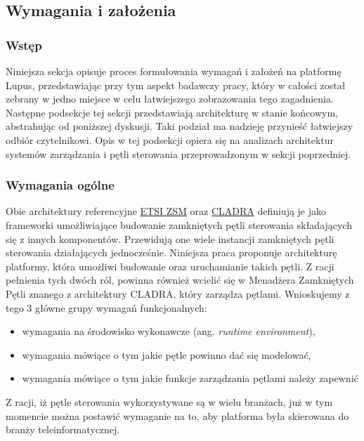 \subsection{Wymagania i założenia}

\subsubsection{Wstęp}

Niniejsza sekcja opisuje proces formułowania wymagań i założeń na platformę Lupus, przedstawiając przy tym aspekt badawczy pracy, który w całości został zebrany w jedno miejsce w celu łatwiejszego zobrazowania tego zagadnienia. Następne podsekcje tej sekcji przedstawiają architekturę w stanie końcowym, abstrahując od poniższej dyskusji. Taki podział ma nadzieję przynieść łatwiejszy odbiór czytelnikowi. Opis w tej podsekcji opiera się na analizach architektur systemów zarządzania i pętli sterowania przeprowadzonym w sekcji poprzedniej.

\subsubsection{Wymagania ogólne}

Obie architektury referencyjne \hyperlink{sec:zsm}{ETSI ZSM} oraz \hyperlink{sec:cladra}{CLADRA} definiują je jako frameworki umożliwiające budowanie zamkniętych pętli sterowania składających się z innych komponentów. Przewidują one wiele instancji zamkniętych pętli sterowania działających jednocześnie. Niniejsza praca proponuje architekturę platformy, która umożliwi budowanie oraz uruchamianie takich pętli. Z racji pełnienia tych dwóch ról, powinna również wcielić się w Menadżera Zamkniętych Pętli znanego z architektury CLADRA, który zarządza pętlami. Wnioskujemy z tego 3 główne grupy wymagań funkcjonalnych:
\begin{itemize}
    \item wymagania na środowisko wykonawcze (ang. \textit{runtime environment}), 
    \item wymagania mówiące o tym jakie pętle powinno dać się modelować,
    \item wymagania mówiące o tym jakie funkcje zarządzania pętlami należy zapewnić
\end{itemize}

Z racji, iż pętle sterowania wykorzystywane są w wielu branżach, już w tym momencie można postawić wymaganie na to, aby platforma była skierowana do branży teleinformatycznej. 

